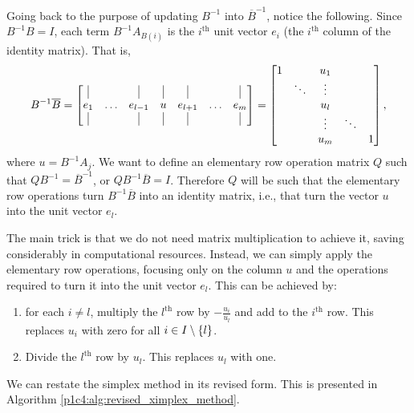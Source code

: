 Going back to the purpose of updating $B^{-1}$ into $\overline{B}^{-1}$,  notice the following. Since $B^{-1}B = I$, each term $B^{-1}A_{B(i)}$ is the $i^{\text{th}}$ unit vector $e_i$ (the $i^{\text{th}}$ column of the identity matrix). That is, 
%
\begin{equation*}
	B^{-1}\overline{B} = \begin{bmatrix} \vline & & \vline & \vline & \vline & & \vline \\
		e_1 & \dots & e_{l-1} & u & e_{l+1} & \dots & e_m \\
		 \vline & & \vline & \vline & \vline & & \vline								
	\end{bmatrix} = \begin{bmatrix} 1 & & u_1 & & \\ & \ddots & \vdots &  & \\ & & u_l & & \\ & & \vdots & \ddots & \\
	& & u_m & & 1 
	 	\end{bmatrix},
\end{equation*}
%
where $u = B^{-1}A_j$. We want to define an elementary row operation matrix $Q$ such that $QB^{-1} = \overline{B}^{-1}$, or $QB^{-1}\overline{B} = I$. Therefore $Q$ will be such that the elementary row operations turn $B^{-1}\overline{B}$ into an identity matrix, i.e., that turn the vector $u$ into the unit vector $e_l$.

The main trick is that we do not need matrix multiplication to achieve it, saving considerably in computational resources. Instead, we can simply apply the elementary row operations, focusing only on the column $u$ and the operations required to turn it into the unit vector $e_l$. This can be achieved by:

\begin{enumerate}
	\item for each $i \neq l$, multiply the $l^{\text{th}}$ row by $-\frac{u_i}{u_l}$ and add to the $i^{\text{th}}$ row. This replaces $u_i$ with zero for all $i \in I \setminus \left\{ l \right \}$.
	\item Divide the $l^{\text{th}}$ row by $u_l$. This replaces $u_l$ with one.
\end{enumerate}

We can restate the simplex method in its revised form. This is presented in Algorithm \ref{p1c4:alg:revised_ximplex_method}.

